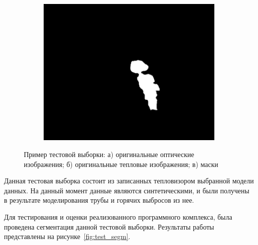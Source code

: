 \documentclass[14pt, a4paper]{extreport}
\begin{document}
\begin{figure}[h!]
\begin{subfigure}{.32\textwidth}
			\includegraphics[width = \textwidth]{image/chapter_3/examples/mask_razmet/159}
			\caption{}
		\end{subfigure}
		\caption{Пример тестовой выборки: а) оригинальные оптические изображения; б) оригинальные тепловые изображения; в) маски}
		\label{fig:test_vib}
	\end{figure}
	
	Данная тестовая выборка состоит из записанных тепловизором выбранной модели данных. На данный момент данные являются синтетическими, и были получены в результате моделирования трубы и горячих выбросов из нее.
	
	Для тестирования и оценки реализованного программного комплекса, была проведена сегментация данной тестовой выборки. Результаты работы представлены на рисунке~\ref{fig:test_segm}.
	
\end{document}
